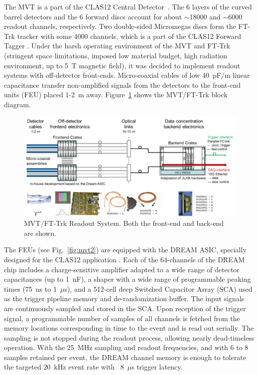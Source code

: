 The MVT is a part of the CLAS12 Central Detector~\cite{mvt-ref}. The 6 layers of the curved barrel detectors and the
6 forward discs account for about $\sim$18000 and $\sim$6000 readout channels, respectively. Two double-sided
Micromegas discs form the FT-Trk tracker with some 4000 channels, which is a part of the CLAS12 Forward Tagger
\cite{ft-ref}. Under the harsh operating environment of the MVT and FT-Trk (stringent space limitations, imposed low
material budget, high radiation environment, up to 5~T magnetic field), it was decided to implement readout systems with
off-detector front-ends. Micro-coaxial cables of low 40~pF/m linear capacitance transfer non-amplified signals from the
detectors to the front-end units (FEU) placed 1-2~m away. Figure~\ref{fig:mvt1} shows the MVT/FT-Trk block diagram.

\begin{figure}[hbt]
	\centering
	\includegraphics[width=1.0\columnwidth,keepaspectratio]{img/mvt1.png}
	\caption{MVT/FT-Trk Readout System. Both the front-end and back-end are shown.}
	\label{fig:mvt1}
\end{figure}

The FEUs (see Fig.~\ref{fig:mvt2}) are equipped with the DREAM ASIC, specially designed for the CLAS12 application
\cite{dream-ref}. Each of the 64-channels of the DREAM chip includes a charge-sensitive amplifier adapted to a wide
range of detector capacitances (up to 1~nF), a shaper with a wide range of programmable peaking times (75~ns to
1~$\mu$s), and a 512-cell deep Switched Capacitor Array (SCA) used as the trigger pipeline memory and
de-randomization buffer. The input signals are continuously sampled and stored in the SCA. Upon reception of the trigger
signal, a programmable number of samples of all channels is fetched from the memory locations corresponding in time to
the event and is read out serially. The sampling is not stopped during the readout process, allowing nearly dead-timeless
operation. With the 25~MHz sampling and readout frequencies, and with 6 to 8 samples retained per event, the DREAM
channel memory is enough to tolerate the targeted 20~kHz event rate with ~8~$\mu$s trigger latency.

